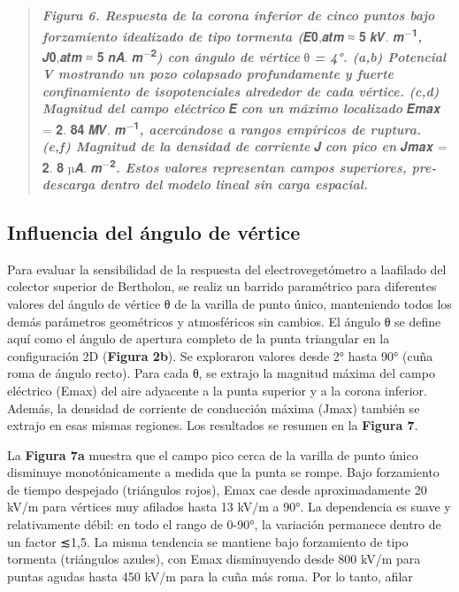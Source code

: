 \documentclass[
]{article}
\begin{document}
\begin{quote}
\textbf{\emph{Figura 6. Respuesta de la corona inferior de cinco puntos
bajo forzamiento idealizado de tipo tormenta (}}𝑬𝟎,𝒂𝒕𝒎 ≈ 𝟓 𝒌𝑽.
𝒎\textsuperscript{−𝟏}\textbf{\emph{,}} 𝑱𝟎,𝒂𝒕𝒎 ≈ 𝟓 𝒏𝑨.
𝒎\textsuperscript{−𝟐}\textbf{\emph{) con ángulo de vértice}} θ
\textbf{\emph{= 4°. (a,b) Potencial V mostrando un pozo colapsado
profundamente y fuerte confinamiento de isopotenciales alrededor de cada
vértice. (c,d) Magnitud del campo eléctrico}} \textbar 𝑬\textbar{}
\textbf{\emph{con un máximo localizado}} 𝑬𝒎𝒂𝒙 = 𝟐. 𝟖𝟒 𝑴𝑽.
𝒎\textsuperscript{−𝟏}\textbf{\emph{, acercándose a rangos empíricos de
ruptura. (e,f) Magnitud de la densidad de corriente}}
\textbar 𝑱\textbar{} \textbf{\emph{con pico en}} 𝑱𝒎𝒂𝒙 = 𝟐. 𝟖 µ𝑨.
𝒎\textsuperscript{−𝟐}\textbf{\emph{. Estos valores representan campos
superiores, pre-descarga dentro del modelo lineal sin carga espacial.}}
\end{quote}

\subsection{Influencia del ángulo de
vértice}\label{influencia-del-uxe1ngulo-de-vuxe9rtice}

Para evaluar la sensibilidad de la respuesta del electrovegetómetro a
laafilado del colector superior de Bertholon, se realiz un barrido
paramétrico para diferentes valores del ángulo de vértice θ de la
varilla de punto único, manteniendo todos los demás parámetros
geométricos y atmosféricos sin cambios. El ángulo θ se define aquí como
el ángulo de apertura completo de la punta triangular en la
configuración 2D (\textbf{Figura 2b}). Se exploraron valores desde 2°
hasta 90° (cuña roma de ángulo recto). Para cada θ, se extrajo la
magnitud máxima del campo eléctrico (Emax) del aire adyacente a la punta
superior y a la corona inferior. Además, la densidad de corriente de
conducción máxima (Jmax) también se extrajo en esas mismas regiones. Los
resultados se resumen en la \textbf{Figura 7}.

La \textbf{Figura 7a} muestra que el campo pico cerca de la varilla de
punto único disminuye monotónicamente a medida que la punta se rompe.
Bajo forzamiento de tiempo despejado (triángulos rojos), Emax cae desde
aproximadamente 20 kV/m para vértices muy afilados hasta 13 kV/m a 90°.
La dependencia es suave y relativamente débil: en todo el rango de
0-90°, la variación permanece dentro de un factor ≲1,5. La misma
tendencia se mantiene bajo forzamiento de tipo tormenta (triángulos
azules), con Emax disminuyendo desde 800 kV/m para puntas agudas hasta
450 kV/m para la cuña más roma. Por lo tanto, afilar
\end{document}
